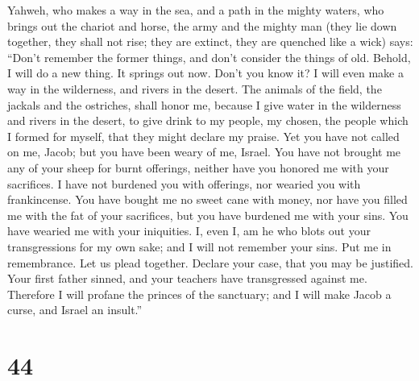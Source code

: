 Yahweh, who makes a way in the sea, and a path in the
mighty waters,  who brings out the chariot and horse, the
army and the mighty man (they lie down together, they shall not rise;
they are extinct, they are quenched like a wick) says: 
``Don't remember the former things, and don't consider the things of
old.  Behold, I will do a new thing. It springs out now.
Don't you know it? I will even make a way in the wilderness, and rivers
in the desert.  The animals of the field, the jackals and
the ostriches, shall honor me, because I give water in the wilderness
and rivers in the desert, to give drink to my people, my chosen,
 the people which I formed for myself, that they might
declare my praise.  Yet you have not called on me, Jacob;
but you have been weary of me, Israel.  You have not
brought me any of your sheep for burnt offerings, neither have you
honored me with your sacrifices. I have not burdened you with offerings,
nor wearied you with frankincense.  You have bought me no
sweet cane with money, nor have you filled me with the fat of your
sacrifices, but you have burdened me with your sins. You have wearied me
with your iniquities.  I, even I, am he who blots out
your transgressions for my own sake; and I will not remember your sins.
 Put me in remembrance. Let us plead together. Declare
your case, that you may be justified.  Your first father
sinned, and your teachers have transgressed against me. 
Therefore I will profane the princes of the sanctuary; and I will make
Jacob a curse, and Israel an insult.''

\hypertarget{section-43}{%
\section{44}\label{section-43}}

